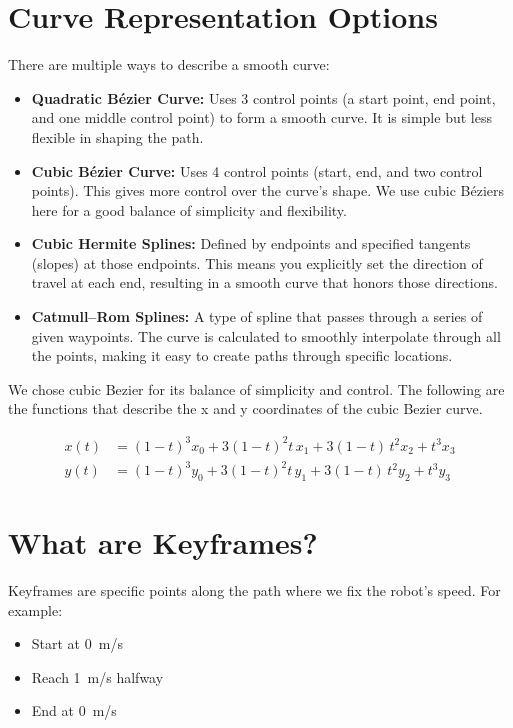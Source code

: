 \documentclass[11pt]{article}
\begin{document}
\section{Curve Representation Options}

There are multiple ways to describe a smooth curve:

\begin{itemize}
  \item \textbf{Quadratic Bézier Curve:} Uses 3 control points (a start point, end point, and one middle control point) to form a smooth curve. It is simple but less flexible in shaping the path.
  \item \textbf{Cubic Bézier Curve:} Uses 4 control points (start, end, and two control points). This gives more control over the curve's shape. We use cubic Béziers here for a good balance of simplicity and flexibility.
  \item \textbf{Cubic Hermite Splines:} Defined by endpoints and specified tangents (slopes) at those endpoints. This means you explicitly set the direction of travel at each end, resulting in a smooth curve that honors those directions.
  \item \textbf{Catmull--Rom Splines:} A type of spline that passes through a series of given waypoints. The curve is calculated to smoothly interpolate through all the points, making it easy to create paths through specific locations.
\end{itemize}

We chose cubic Bezier for its balance of simplicity and control. The following are the functions that describe the x and y coordinates of the cubic Bezier curve.

\[
\begin{aligned}
x(t) &= (1 - t)^3 x_0 + 3(1 - t)^2 t\, x_1 + 3(1 - t)\, t^2 x_2 + t^3 x_3 \\
y(t) &= (1 - t)^3 y_0 + 3(1 - t)^2 t\, y_1 + 3(1 - t)\, t^2 y_2 + t^3 y_3
\end{aligned}
\]

\section{What are Keyframes?}

Keyframes are specific points along the path where we fix the robot’s speed. For example:

\begin{itemize}
  \item Start at 0~m/s
  \item Reach 1~m/s halfway
  \item End at 0~m/s
\end{itemize}
\end{document}
